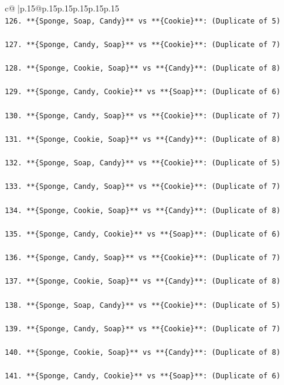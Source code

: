 \documentclass{article}
\begin{document}
{\begin{supertabular}{c@{$\;$}|p{.15\linewidth}@{}p{.15\linewidth}p{.15\linewidth}p{.15\linewidth}p{.15\linewidth}p{.15\linewidth}}
{{{\\ 
\texttt{126. **\{Sponge, Soap, Candy\}** vs **\{Cookie\}**: (Duplicate of 5)} \\
\\ 
\texttt{127. **\{Sponge, Candy, Soap\}** vs **\{Cookie\}**: (Duplicate of 7)} \\
\\ 
\texttt{128. **\{Sponge, Cookie, Soap\}** vs **\{Candy\}**: (Duplicate of 8)} \\
\\ 
\texttt{129. **\{Sponge, Candy, Cookie\}** vs **\{Soap\}**: (Duplicate of 6)} \\
\\ 
\texttt{130. **\{Sponge, Candy, Soap\}** vs **\{Cookie\}**: (Duplicate of 7)} \\
\\ 
\texttt{131. **\{Sponge, Cookie, Soap\}** vs **\{Candy\}**: (Duplicate of 8)} \\
\\ 
\texttt{132. **\{Sponge, Soap, Candy\}** vs **\{Cookie\}**: (Duplicate of 5)} \\
\\ 
\texttt{133. **\{Sponge, Candy, Soap\}** vs **\{Cookie\}**: (Duplicate of 7)} \\
\\ 
\texttt{134. **\{Sponge, Cookie, Soap\}** vs **\{Candy\}**: (Duplicate of 8)} \\
\\ 
\texttt{135. **\{Sponge, Candy, Cookie\}** vs **\{Soap\}**: (Duplicate of 6)} \\
\\ 
\texttt{136. **\{Sponge, Candy, Soap\}** vs **\{Cookie\}**: (Duplicate of 7)} \\
\\ 
\texttt{137. **\{Sponge, Cookie, Soap\}** vs **\{Candy\}**: (Duplicate of 8)} \\
\\ 
\texttt{138. **\{Sponge, Soap, Candy\}** vs **\{Cookie\}**: (Duplicate of 5)} \\
\\ 
\texttt{139. **\{Sponge, Candy, Soap\}** vs **\{Cookie\}**: (Duplicate of 7)} \\
\\ 
\texttt{140. **\{Sponge, Cookie, Soap\}** vs **\{Candy\}**: (Duplicate of 8)} \\
\\ 
\texttt{141. **\{Sponge, Candy, Cookie\}** vs **\{Soap\}**: (Duplicate of 6)} \\
}}}
\end{supertabular}}
\end{document}
